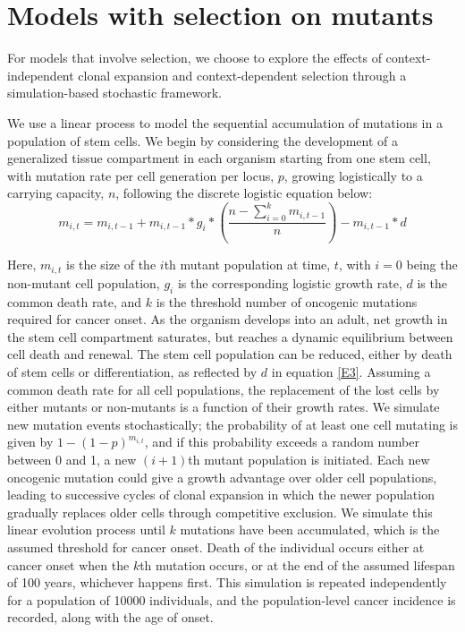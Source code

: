 \documentclass[12pt,onecolumn,twoside]{article}
\begin{document}
\section{Models with selection on mutants}
For models that involve selection, we choose to explore the effects of context-independent clonal expansion and context-dependent selection through a simulation-based stochastic framework. 

We use a linear process to model the sequential accumulation of mutations in a population of stem cells. We begin by considering the development of a generalized tissue compartment in each organism starting from one stem cell, with mutation rate per cell generation per locus, $p$, growing logistically to a carrying capacity, $n$, following the discrete logistic equation below:
\begin{equation}
	m_{i, t} = m_{i, t-1} + m_{i, t-1}*g_{i}*(\dfrac{n-\sum_{i=0}^{k} m_{i, t-1}}{n}) - m_{i, t-1}*d
	\label{E3}	
\end{equation}

Here, $m_{i, t}$ is the size of the $i$th mutant population at time, $t$, with $i=0$ being the non-mutant cell population, $g_{i}$ is the corresponding logistic growth rate, $d$ is the common death rate, and $k$ is the threshold number of oncogenic mutations required for cancer onset. As the organism develops into an adult, net growth in the stem cell compartment saturates, but reaches a dynamic equilibrium between cell death and renewal. The stem cell population can be reduced, either by death of stem cells or differentiation, as reflected by $d$ in equation \ref{E3}. Assuming a common death rate for all cell populations, the replacement of the lost cells by either mutants or non-mutants is a function of their growth rates. We simulate new mutation events stochastically; the probability of at least one cell mutating is given by $1-(1-p)^{m_{i, t}}$, and if this probability exceeds a random number between 0 and 1, a new $(i+1)$th mutant population is initiated. Each new oncogenic mutation could give a growth advantage over older cell populations, leading to successive cycles of clonal expansion in which the newer population gradually replaces older cells through competitive exclusion. We simulate this linear evolution process until $k$ mutations have been accumulated, which is the assumed threshold for cancer onset. Death of the individual occurs either at cancer onset when the $k$th mutation occurs, or at the end of the assumed lifespan of 100 years, whichever happens first. This simulation is repeated independently for a population of 10000 individuals, and the population-level cancer incidence is recorded, along with the age of onset.
\end{document}
